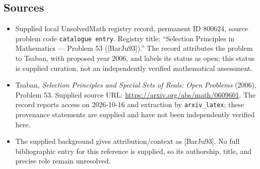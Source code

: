 \documentclass[11pt]{article}
\begin{document}
\subsection{Sources}
\begin{itemize}
\item Supplied local UnsolvedMath registry record, permanent ID \(800624\), source problem code \texttt{catalogue entry}. Registry title: ``Selection Principles in Mathematics --- Problem 53 ([BarJu93]).'' The record attributes the problem to Tsaban, with proposed year 2006, and labels its status as open; this status is supplied curation, not an independently verified mathematical assessment.
\item Tsaban, \emph{Selection Principles and Special Sets of Reals: Open Problems} (2006), Problem 53. Supplied source URL: \url{https://arxiv.org/abs/math/0609601}. The record reports access on 2026-10-16 and extraction by \texttt{arxiv\_latex}; these provenance statements are supplied and have not been independently verified here.
\item The supplied background gives attribution/context as [BarJu93]. No full bibliographic entry for this reference is supplied, so its authorship, title, and precise role remain unresolved.
\end{itemize}
\end{document}
